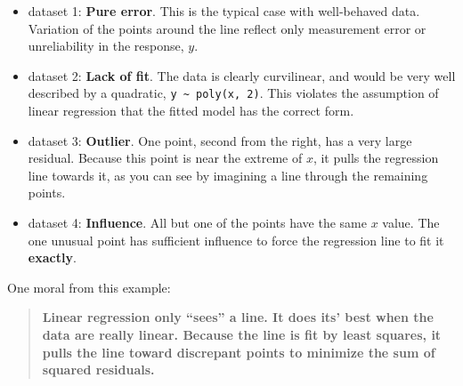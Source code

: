 \documentclass[
  letterpaper,
  10pt,
  krantz2]{krantz}
\begin{document}
\begin{itemize}
\item
  dataset 1: \textbf{Pure error}. This is the typical case with
  well-behaved data. Variation of the points around the line reflect
  only measurement error or unreliability in the response, \(y\).
\item
  dataset 2: \textbf{Lack of fit}. The data is clearly curvilinear, and
  would be very well described by a quadratic,
  \texttt{y\ \textasciitilde{}\ poly(x,\ 2)}. This violates the
  assumption of linear regression that the fitted model has the correct
  form.
\item
  dataset 3: \textbf{Outlier}. One point, second from the right, has a
  very large residual. Because this point is near the extreme of \(x\),
  it pulls the regression line towards it, as you can see by imagining a
  line through the remaining points.
\item
  dataset 4: \textbf{Influence}. All but one of the points have the same
  \(x\) value. The one unusual point has sufficient influence to force
  the regression line to fit it \textbf{exactly}.
\end{itemize}

One moral from this example:

\begin{quote}
\textbf{Linear regression only ``sees'' a line. It does its' best when
the data are really linear. Because the line is fit by least squares, it
pulls the line toward discrepant points to minimize the sum of squared
residuals.}
\end{quote}
\end{document}
